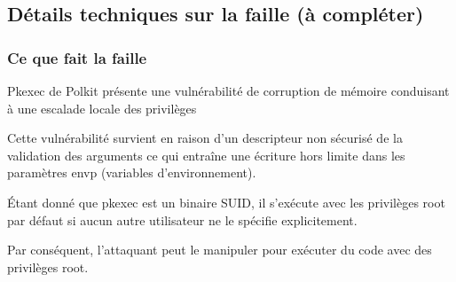 \documentclass[12pt,a4paper]{article}
\begin{document}
   		\subsection{Détails techniques sur la faille (à compléter) }
   		\begin{flushleft}
            \subsubsection{Ce que fait la faille}
                \begin{flushleft}
                     \noindent Pkexec de Polkit présente une vulnérabilité de corruption de mémoire conduisant à une escalade locale des privilèges
                    \item Cette vulnérabilité survient en raison d’un descripteur non sécurisé de la validation des arguments ce qui entraîne une écriture hors limite dans les paramètres envp (variables d’environnement).
                    \item Étant donné que pkexec est un binaire SUID, il s’exécute avec les privilèges root par défaut si aucun autre utilisateur ne le spécifie explicitement. 
                    \item Par conséquent, l’attaquant peut le manipuler pour exécuter du code avec des privilèges root.
                \end{flushleft}

\end{flushleft}
\end{document}
